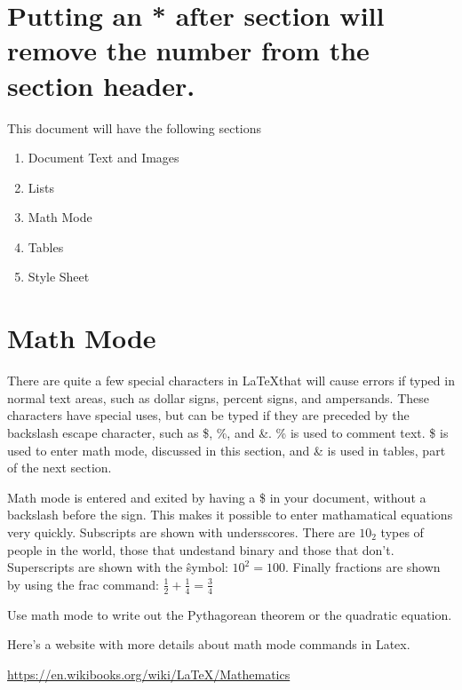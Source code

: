 \documentclass{article}
\begin{document}
\section*{Putting an * after section will remove the number from the section header.}

This document will have the following sections
\begin{enumerate}
\item  Document Text and Images
\item  Lists
\item  Math Mode
\item  Tables
\item  Style Sheet
\end{enumerate}


\section{Math Mode}

There are quite a few special characters in \LaTeX that will cause errors if typed in normal text areas, such as dollar signs, percent signs, and ampersands.  These characters have special uses, but can be typed if they are preceded by the backslash escape character, such as \$, \%, and \&.  \% is used to comment text.  \$ is used to enter math mode, discussed in this section, and \& is used in tables, part of the next section.

Math mode is entered and exited by having a \$ in your document, without a backslash before the sign.  This makes it possible to enter mathamatical equations very quickly.  Subscripts are shown with undersscores.  There are $10_2$ types of people in the world, those that undestand binary and those that don't.  Superscripts are shown with the \^ symbol:  $10^2 = 100$.  Finally fractions are shown by using the frac command:  $\frac{1}{2} + \frac{1}{4} = \frac{3}{4}$

Use math mode to write out the Pythagorean theorem or the quadratic equation.

Here's a website with more details about math mode commands in Latex.

\url{https://en.wikibooks.org/wiki/LaTeX/Mathematics}
\end{document}
